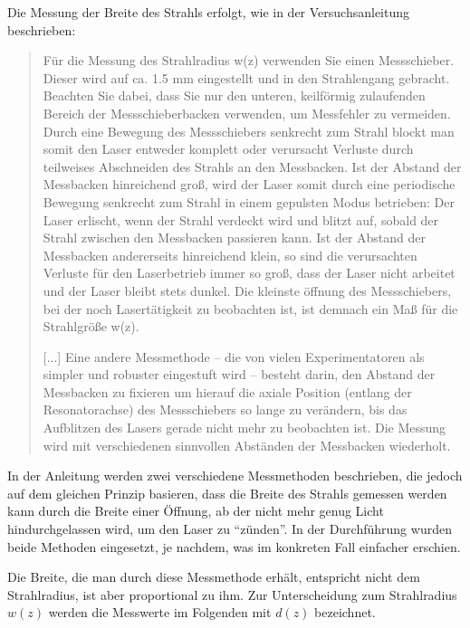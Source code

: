 \documentclass{article}
\begin{document}
Die Messung der Breite des Strahls erfolgt, wie in der Versuchsanleitung \cite{Anleitung} beschrieben:
\blockquote{
  Für die Messung des Strahlradius w(z) verwenden Sie einen Messschieber. Dieser wird auf ca. 1.5 mm eingestellt und in den Strahlengang gebracht.
  Beachten Sie dabei, dass Sie nur den unteren, keilförmig zulaufenden Bereich der Messschieberbacken verwenden, um Messfehler zu vermeiden.
  Durch eine Bewegung des Messschiebers senkrecht zum Strahl
  blockt man somit den Laser entweder komplett oder verursacht Verluste durch teilweises Abschneiden des Strahls an den Messbacken.
  Ist der Abstand der Messbacken hinreichend groß, wird der Laser somit durch eine periodische Bewegung
  senkrecht zum Strahl in einem gepulsten Modus betrieben: Der Laser erlischt, wenn der Strahl verdeckt wird und blitzt auf,
  sobald der Strahl zwischen den Messbacken passieren kann. Ist der Abstand der Messbacken andererseits hinreichend klein,
  so sind die verursachten Verluste für den Laserbetrieb immer so groß, dass der Laser nicht arbeitet und der Laser bleibt
  stets dunkel. Die kleinste öffnung des Messschiebers, bei der noch Lasertätigkeit zu beobachten ist,
  ist demnach ein Maß für die Strahlgröße w(z). 
  
  [...] Eine andere Messmethode -- die von vielen Experimentatoren als simpler und robuster eingestuft wird -- besteht darin, 
  den Abstand der Messbacken zu fixieren um hierauf die axiale Position (entlang der Resonatorachse) des Messschiebers
  so lange zu verändern, bis das Aufblitzen des Lasers gerade nicht mehr zu beobachten ist.
  Die Messung wird mit verschiedenen sinnvollen Abständen der Messbacken wiederholt.
} 
In der Anleitung werden zwei verschiedene Messmethoden beschrieben, die jedoch auf dem gleichen Prinzip basieren,
dass die Breite des Strahls gemessen werden kann durch die Breite einer Öffnung, ab der nicht mehr genug Licht hindurchgelassen
wird, um den Laser zu \enquote{zünden}. In der Durchführung wurden beide Methoden eingesetzt, je nachdem,
was im konkreten Fall einfacher erschien.

Die Breite, die man durch diese Messmethode erhält, entspricht nicht dem Strahlradius, ist aber proportional zu ihm.
Zur Unterscheidung zum Strahlradius $w(z)$ werden die Messwerte im Folgenden mit $d(z)$ bezeichnet.
\end{document}
